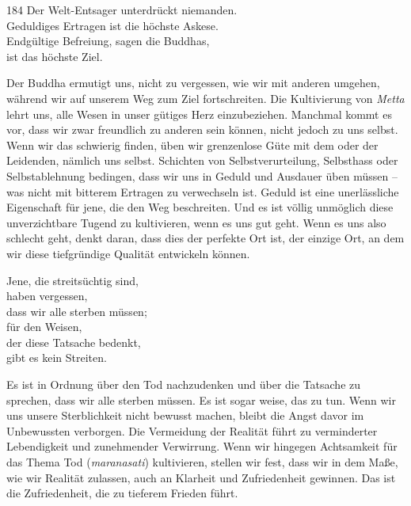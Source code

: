 
\begin{dhpVerse}{184}
\label{dhp-184}
Der Welt-Entsager unterdrückt niemanden.\\ 
Geduldiges Ertragen ist die höchste Askese.\\ 
Endgültige Befreiung, sagen die Buddhas,\\ 
ist das höchste Ziel. 
\end{dhpVerse}

\begin{dhpRefl}

Der Buddha ermutigt uns, nicht zu vergessen, wie wir mit anderen umgehen,
während wir auf unserem Weg zum Ziel fortschreiten. Die Kultivierung von
\emph{Metta} lehrt uns, alle Wesen in unser gütiges Herz einzubeziehen.
Manchmal kommt es vor, dass wir zwar freundlich zu anderen sein können, nicht
jedoch zu uns selbst. Wenn wir das schwierig finden, üben wir grenzenlose Güte
mit dem oder der Leidenden, nämlich uns selbst. Schichten von
Selbstverurteilung, Selbsthass oder Selbstablehnung bedingen, dass wir uns in
Geduld und Ausdauer üben müssen -- was nicht mit bitterem Ertragen zu
verwechseln ist. Geduld ist eine unerlässliche Eigenschaft für jene, die den
Weg beschreiten. Und es ist völlig unmöglich diese unverzichtbare Tugend zu
kultivieren, wenn es uns gut geht. Wenn es uns also schlecht geht, denkt
daran, dass dies der perfekte Ort ist, der einzige Ort, an dem wir diese
tiefgründige Qualität entwickeln können.

\end{dhpRefl}


\begin{dhpVerse}{6}
\label{dhp-6}
Jene, die streitsüchtig sind,\\ 
haben vergessen,\\ 
dass wir alle sterben müssen;\\ 
für den Weisen,\\ 
der diese Tatsache bedenkt,\\ 
gibt es kein Streiten. 
\end{dhpVerse}

\begin{dhpRefl}

Es ist in Ordnung über den Tod nachzudenken und über die Tatsache zu sprechen,
dass wir alle sterben müssen. Es ist sogar weise, das zu tun. Wenn wir uns
unsere Sterblichkeit nicht bewusst machen, bleibt die Angst davor im
Unbewussten verborgen. Die Vermeidung der Realität führt zu verminderter
Lebendigkeit und zunehmender Verwirrung. Wenn wir hingegen Achtsamkeit für das
Thema Tod (\emph{maranasati}) kultivieren, stellen wir fest, dass wir in dem
Maße, wie wir Realität zulassen, auch an Klarheit und Zufriedenheit gewinnen.
Das ist die Zufriedenheit, die zu tieferem Frieden führt.

\end{dhpRefl}

